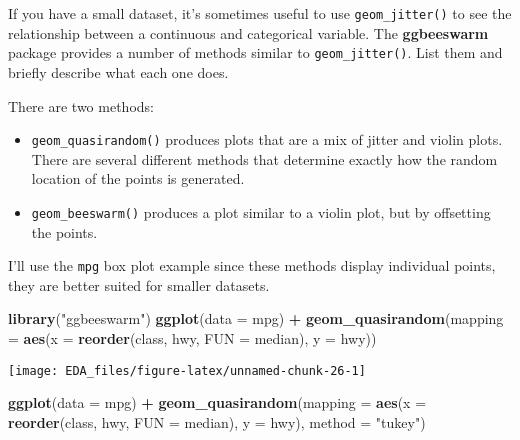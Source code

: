 \documentclass[]{book}
\newenvironment{Shaded}{\begin{snugshade}}{\end{snugshade}}
\newcommand{\DataTypeTok}[1]{\textcolor[rgb]{0.13,0.29,0.53}{#1}}
\newcommand{\KeywordTok}[1]{\textcolor[rgb]{0.13,0.29,0.53}{\textbf{#1}}}
\newcommand{\NormalTok}[1]{#1}
\newcommand{\OperatorTok}[1]{\textcolor[rgb]{0.81,0.36,0.00}{\textbf{#1}}}
\newcommand{\StringTok}[1]{\textcolor[rgb]{0.31,0.60,0.02}{#1}}
\providecommand{\tightlist}{%
  \setlength{\itemsep}{0pt}\setlength{\parskip}{0pt}}
\theoremstyle{plain}
\theoremstyle{remark}
\theoremstyle{definition}
\theoremstyle{definition}
\theoremstyle{definition}
\theoremstyle{remark}
\begin{document}
If you have a small dataset, it's sometimes useful to use
\texttt{geom\_jitter()} to see the relationship between a continuous and
categorical variable. The \textbf{ggbeeswarm} package provides a number
of methods similar to \texttt{geom\_jitter()}. List them and briefly
describe what each one does.

There are two methods:

\begin{itemize}
\tightlist
\item
  \texttt{geom\_quasirandom()} produces plots that are a mix of jitter
  and violin plots. There are several different methods that determine
  exactly how the random location of the points is generated.
\item
  \texttt{geom\_beeswarm()} produces a plot similar to a violin plot,
  but by offsetting the points.
\end{itemize}

I'll use the \texttt{mpg} box plot example since these methods display
individual points, they are better suited for smaller datasets.

\begin{Shaded}
\begin{Highlighting}[]
\KeywordTok{library}\NormalTok{(}\StringTok{"ggbeeswarm"}\NormalTok{)}
\KeywordTok{ggplot}\NormalTok{(}\DataTypeTok{data =}\NormalTok{ mpg) }\OperatorTok{+}
\StringTok{  }\KeywordTok{geom_quasirandom}\NormalTok{(}\DataTypeTok{mapping =} \KeywordTok{aes}\NormalTok{(}\DataTypeTok{x =} \KeywordTok{reorder}\NormalTok{(class, hwy, }\DataTypeTok{FUN =}\NormalTok{ median),}
                                 \DataTypeTok{y =}\NormalTok{ hwy))}
\end{Highlighting}
\end{Shaded}

\begin{center}\texttt{[image: EDA\_files/figure-latex/unnamed-chunk-26-1]} \end{center}

\begin{Shaded}
\begin{Highlighting}[]
\KeywordTok{ggplot}\NormalTok{(}\DataTypeTok{data =}\NormalTok{ mpg) }\OperatorTok{+}
\StringTok{  }\KeywordTok{geom_quasirandom}\NormalTok{(}\DataTypeTok{mapping =} \KeywordTok{aes}\NormalTok{(}\DataTypeTok{x =} \KeywordTok{reorder}\NormalTok{(class, hwy, }\DataTypeTok{FUN =}\NormalTok{ median),}
                                 \DataTypeTok{y =}\NormalTok{ hwy),}
                   \DataTypeTok{method =} \StringTok{"tukey"}\NormalTok{)}
\end{Highlighting}
\end{Shaded}
\end{document}
